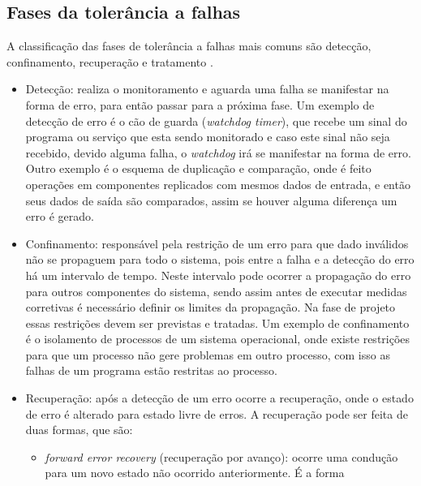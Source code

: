 \subsection{Fases da tolerância a falhas}
\label{section:fasestolerancia}

A classificação das fases de tolerância a falhas mais comuns são detecção, confinamento, recuperação e tratamento \cite{weber2002}.


\begin{itemize}
 \item Detecção: realiza o monitoramento e aguarda uma falha se manifestar na forma de erro, para então passar para a próxima fase. 
 Um exemplo de detecção de erro é o cão de guarda (\textit{watchdog timer}), que recebe um sinal do programa ou serviço que esta sendo 
 monitorado e caso este sinal não seja recebido, devido alguma falha, o \textit{watchdog} irá se manifestar na forma de erro. 
 Outro exemplo é o esquema de duplicação e comparação, onde é feito operações em componentes replicados com mesmos dados de entrada, e então
 seus dados de saída são comparados, assim se houver alguma diferença um erro é gerado.
 \item Confinamento: responsável pela restrição de um erro para que dado inválidos não se propaguem para todo o sistema, pois entre a falha e a
 detecção do erro há um intervalo de tempo. Neste intervalo pode ocorrer a propagação do erro para outros componentes do sistema, sendo assim 
 antes de executar medidas corretivas é necessário definir os limites da propagação. Na fase de projeto essas restrições devem ser previstas
 e tratadas. Um exemplo de confinamento é o isolamento de processos de um sistema operacional, onde existe restrições para que um processo
 não gere problemas em outro processo, com isso as falhas de um programa estão restritas ao processo.
 \item Recuperação: após a detecção de um erro ocorre a recuperação, onde o estado de erro é alterado para estado livre de erros. A recuperação
 pode ser feita de duas formas, que são:
 \begin{itemize}
  \item \textit{forward error recovery} (recuperação por avanço): ocorre uma condução para um novo estado não ocorrido anteriormente. É a forma

\end{itemize}
\end{itemize}
